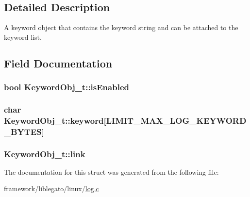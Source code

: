 \subsection{Detailed Description}
A keyword object that contains the keyword string and can be attached to the keyword list. 

\subsection{Field Documentation}
\subsubsection[{\texorpdfstring{is\+Enabled}{isEnabled}}]{\setlength{\rightskip}{0pt plus 5cm}bool Keyword\+Obj\+\_\+t\+::is\+Enabled}\hypertarget{struct_keyword_obj__t_ac2df2a8cac258a7b04c1319b4185bf66}{}\label{struct_keyword_obj__t_ac2df2a8cac258a7b04c1319b4185bf66}
\subsubsection[{\texorpdfstring{keyword}{keyword}}]{\setlength{\rightskip}{0pt plus 5cm}char Keyword\+Obj\+\_\+t\+::keyword\mbox{[}{\bf L\+I\+M\+I\+T\+\_\+\+M\+A\+X\+\_\+\+L\+O\+G\+\_\+\+K\+E\+Y\+W\+O\+R\+D\+\_\+\+B\+Y\+T\+ES}\mbox{]}}\hypertarget{struct_keyword_obj__t_ac56b4c194375209f9063b9eafe38a9ee}{}\label{struct_keyword_obj__t_ac56b4c194375209f9063b9eafe38a9ee}
\subsubsection[{\texorpdfstring{link}{link}}]{ Keyword\+Obj\+\_\+t\+::link}\hypertarget{struct_keyword_obj__t_aa5cf5e438d29843b2c03f8f98ebb042e}{}\label{struct_keyword_obj__t_aa5cf5e438d29843b2c03f8f98ebb042e}


The documentation for this struct was generated from the following file\+:\begin{DoxyCompactItemize}
\item 
framework/liblegato/linux/\hyperlink{log_8c}{log.\+c}\end{DoxyCompactItemize}
